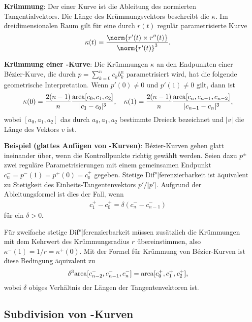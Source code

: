 \textbf{Krümmung}:
Der  einer Kurve ist die Ableitung des normierten Tangentialvektors.
Die Länge des Krümmungsvektors beschreibt die  $\kappa$.
Im dreidimensionalen Raum gilt für eine durch $r(t)$ regulär parametrisierte Kurve
\begin{align*}
    \kappa(t) = \frac{\norm{r'(t) \times r''(t)}}{\norm{r'(t)}^3}.
\end{align*}

\linie

\textbf{Krümmung einer -Kurve}:
Die Krümmungen $\kappa$ an den Endpunkten einer Bézier-Kurve, die durch
$p = \sum_{k=0}^n c_k b_k^n$ parametrisiert wird,
hat die folgende geometrische Interpretation.
Wenn $p'(0) \not= 0$ und $p'(1) \not= 0$ gilt, dann ist
\begin{align*}
    \kappa(0) = \frac{2(n - 1)}{n} \frac{\mathrm{area}[c_0, c_1, c_2]}{|c_1 - c_0|^3},\quad
    \kappa(1) = \frac{2(n - 1)}{n} \frac{\mathrm{area}[c_n, c_{n-1}, c_{n-2}]}{|c_{n-1} - c_n|^3},
\end{align*}
wobei $[a_0, a_1, a_2]$ das durch $a_0, a_1, a_2$ bestimmte Dreieck bezeichnet und
$|v|$ die Länge des Vektors $v$ ist.

\linie

\textbf{Beispiel (glattes Anfügen von -Kurven)}:
Bézier-Kurven gehen glatt ineinander über, wenn die Kontrollpunkte richtig gewählt werden.
Seien dazu $p^\pm$ zwei reguläre Parametrisierungen mit einem gemeinsamen Endpunkt
$c_n^- = p^-(1) = p^+(0) = c_0^+$ gegeben.
Stetige Dif"|ferenzierbarkeit ist äquivalent zu Stetigkeit des Einheits-Tangentenvektors
$p'/|p'|$.
Aufgrund der Ableitungsformel ist dies der Fall, wenn
\begin{align*}
    c_1^+ - c_0^+ = \delta (c_n^- - c_{n-1}^-)
\end{align*}
für ein $\delta > 0$.

Für zweifache stetige Dif"|ferenzierbarkeit müssen zusätzlich die Krümmungen
mit dem Kehrwert des Krümmungsradius $r$ übereinstimmen, also $\kappa^-(1) = 1/r = \kappa^+(0)$.
Mit der Formel für Krümmung von Bézier-Kurven ist diese Bedingung äquivalent zu
\begin{align*}
    \delta^3 \mathrm{area}[c_{n-2}^-, c_{n-1}^-, c_n^-] = \mathrm{area}[c_0^+, c_1^+, c_2^+],
\end{align*}
wobei $\delta$ obiges Verhältnis der Längen der Tangentenvektoren ist.

\subsection{%
    Subdivision von -Kurven%
}

